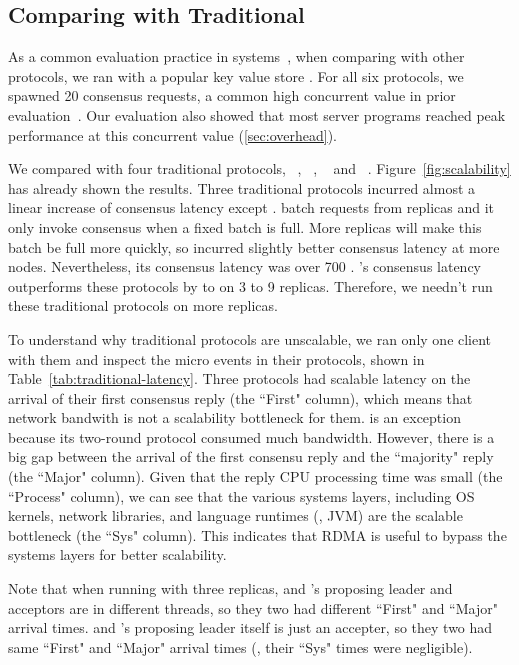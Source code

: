 \subsection{Comparing with Traditional \paxos}
\label{sec:eval-traditional}

As a common evaluation practice in 
\paxos systems~\cite{dare:hpdc15,nopaxos:osdi16}, when comparing \xxx with 
other \paxos protocols, we ran \xxx with a popular key value store \redis. For 
all six \paxos protocols, we spawned 20 consensus requests, a common high 
concurrent value in prior 
evaluation~\cite{zookeeper,crane:sosp15,rex:eurosys14}. Our evaluation also 
showed that most server programs reached peak performance at this concurrent 
value (\ref{sec:overhead}).

We compared \xxx with four traditional protocols, \libpaxos~\cite{libpaxos},
\zookeeper~\cite{zookeeper}, \crane~\cite{crane:sosp15} and
\spaxos~\cite{spaxos}. Figure~\ref{fig:scalability} has already shown the 
results. Three traditional protocols incurred almost a linear increase of 
consensus latency except \spaxos. \spaxos batch requests from replicas and it 
only invoke consensus when a fixed batch is full. More replicas will make this 
batch be full more quickly, so \spaxos incurred slightly better consensus 
latency at more nodes. Nevertheless, its consensus latency was over 700 \us. 
\xxx's consensus latency outperforms these protocols by \comptradlow to 
\comptradhigh on 3 to 9 replicas. Therefore, we needn't run these traditional 
protocols on more replicas.

To understand why traditional protocols are unscalable, we ran 
only one client with them and inspect the micro events in their protocols, 
shown in Table~\ref{tab:traditional-latency}. Three protocols had scalable 
latency on the arrival of their first consensus reply (the ``First" column), 
which means that network bandwith is not a scalability bottleneck for them.  
\libpaxos is an exception because its two-round protocol consumed much 
bandwidth. However, there is a big gap between the arrival of the first 
consensu reply and the ``majority" reply (the ``Major" column). Given that the 
reply CPU processing time was small (the ``Process" column), we can see that 
the various systems layers, including OS kernels, network libraries, and 
language runtimes (\eg, JVM) are the scalable bottleneck (the ``Sys" column). 
This indicates that RDMA is useful to bypass the systems layers for better 
scalability.

Note that when running with three replicas, \libpaxos and \crane's proposing 
leader and acceptors are in different threads, so they two had different 
``First" and ``Major" arrival times. \crane and \spaxos's proposing 
leader itself is just an accepter, so they two had same ``First" and ``Major" 
arrival times (\ie, their ``Sys" times were negligible).

